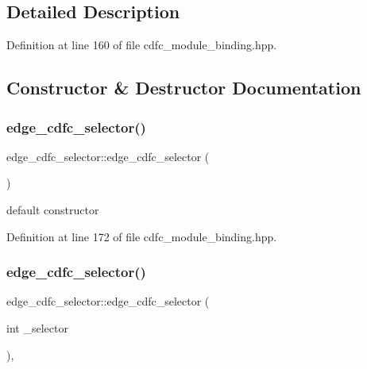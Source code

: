\subsection{Detailed Description}


Definition at line 160 of file cdfc\+\_\+module\+\_\+binding.\+hpp.



\subsection{Constructor \& Destructor Documentation}
\mbox{\label{structedge__cdfc__selector_ae6c724d94d807c036667e1f5c3e11bfc}} 
\subsubsection{\texorpdfstring{edge\+\_\+cdfc\+\_\+selector()}{edge\_cdfc\_selector()}\hspace{0.1cm}{\footnotesize\ttfamily [1/3]}}
{\footnotesize\ttfamily edge\+\_\+cdfc\+\_\+selector\+::edge\+\_\+cdfc\+\_\+selector (\begin{DoxyParamCaption}{ }\end{DoxyParamCaption})\hspace{0.3cm}{\ttfamily [inline]}}



default constructor 



Definition at line 172 of file cdfc\+\_\+module\+\_\+binding.\+hpp.

\mbox{\label{structedge__cdfc__selector_ada77eb69038f88f49a21418693dcf4b2}} 
\subsubsection{\texorpdfstring{edge\+\_\+cdfc\+\_\+selector()}{edge\_cdfc\_selector()}\hspace{0.1cm}{\footnotesize\ttfamily [2/3]}}
{\footnotesize\ttfamily edge\+\_\+cdfc\+\_\+selector\+::edge\+\_\+cdfc\+\_\+selector (\begin{DoxyParamCaption}\item[{int}]{\+\_\+selector }\end{DoxyParamCaption})\hspace{0.3cm}{\ttfamily [inline]}, {\ttfamily [explicit]}}



